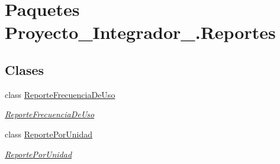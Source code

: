 \hypertarget{namespace_proyecto___integrador__3_1_1_reportes}{\section{Paquetes Proyecto\-\_\-\-Integrador\-\_.\-Reportes}
\label{namespace_proyecto___integrador__3_1_1_reportes}
}
\subsection*{Clases}
\begin{DoxyCompactItemize}
\item 
class \hyperlink{class_proyecto___integrador__3_1_1_reportes_1_1_reporte_frecuencia_de_uso}{Reporte\-Frecuencia\-De\-Uso}
\begin{DoxyCompactList}\small\item\em \hyperlink{class_proyecto___integrador__3_1_1_reportes_1_1_reporte_frecuencia_de_uso}{Reporte\-Frecuencia\-De\-Uso} \end{DoxyCompactList}\item 
class \hyperlink{class_proyecto___integrador__3_1_1_reportes_1_1_reporte_por_unidad}{Reporte\-Por\-Unidad}
\begin{DoxyCompactList}\small\item\em \hyperlink{class_proyecto___integrador__3_1_1_reportes_1_1_reporte_por_unidad}{Reporte\-Por\-Unidad} \end{DoxyCompactList}\end{DoxyCompactItemize}
